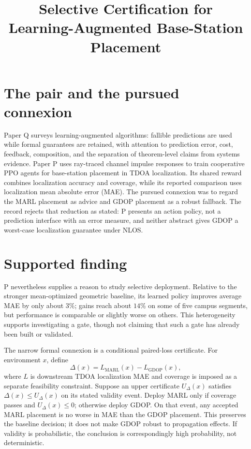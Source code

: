 \documentclass{article}
\title{Selective Certification for Learning-Augmented Base-Station Placement}
\begin{document}
\maketitle

\section{The pair and the pursued connexion}

Paper Q surveys learning-augmented algorithms: fallible predictions are used while formal guarantees are retained, with attention to prediction error, cost, feedback, composition, and the separation of theorem-level claims from systems evidence.  Paper P uses ray-traced channel impulse responses to train cooperative PPO agents for base-station placement in TDOA localization.  Its shared reward combines localization accuracy and coverage, while its reported comparison uses localization mean absolute error (MAE).  The pursued connexion was to regard the MARL placement as advice and GDOP placement as a robust fallback.  The record rejects that reduction as stated: P presents an action policy, not a prediction interface with an error measure, and neither abstract gives GDOP a worst-case localization guarantee under NLOS. 

\section{Supported finding}

P nevertheless supplies a reason to study selective deployment.  Relative to the stronger mean-optimized geometric baseline, its learned policy improves average MAE by only about \(3\%\); gains reach about \(14\%\) on some of five campus segments, but performance is comparable or slightly worse on others.  This heterogeneity supports investigating a gate, though not claiming that such a gate has already been built or validated. 

The narrow formal connexion is a conditional paired-loss certificate.  For environment \(x\), define
\[
  \Delta(x)=L_{\mathrm{MARL}}(x)-L_{\mathrm{GDOP}}(x),
\]
where \(L\) is downstream TDOA localization MAE and coverage is imposed as a separate feasibility constraint.  Suppose an upper certificate \(U_\Delta(x)\) satisfies \(\Delta(x)\leq U_\Delta(x)\) on its stated validity event.  Deploy MARL only if coverage passes and \(U_\Delta(x)\leq 0\); otherwise deploy GDOP.  On that event, any accepted MARL placement is no worse in MAE than the GDOP placement.  This preserves the baseline decision; it does not make GDOP robust to propagation effects.  If validity is probabilistic, the conclusion is correspondingly high probability, not deterministic. 
\end{document}
